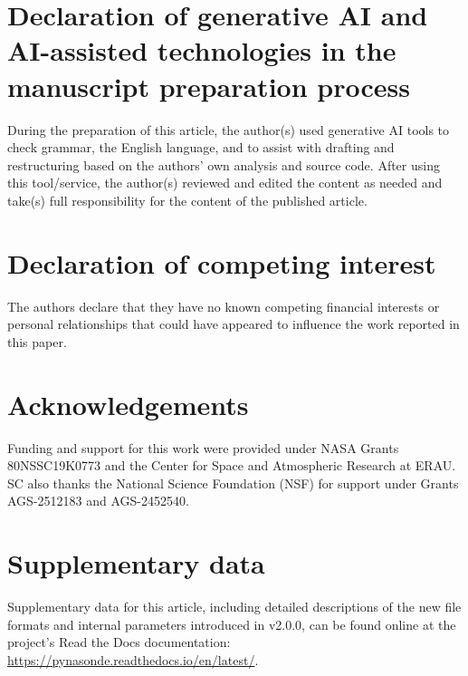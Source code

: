 \documentclass[12pt,a4paper]{article}
\begin{document}
\section*{Declaration of generative AI and AI-assisted technologies in the manuscript preparation process}

During the preparation of this article, the author(s) used generative AI
tools to check grammar, the English language, and to assist with drafting
and restructuring based on the authors' own analysis and source code. After
using this tool/service, the author(s) reviewed and edited the content as
needed and take(s) full responsibility for the content of the published
article.

\section*{Declaration of competing interest}

The authors declare that they have no known competing financial interests or
personal relationships that could have appeared to influence the work
reported in this paper.

\section*{Acknowledgements}

Funding and support for this work were provided under NASA Grants
80NSSC19K0773 and the Center for Space and Atmospheric Research at ERAU. SC
also thanks the National Science Foundation (NSF) for support under Grants
AGS-2512183 and AGS-2452540.

\appendix
\section{Supplementary data}

Supplementary data for this article, including detailed descriptions of the
new file formats and internal parameters introduced in v2.0.0, can be found
online at the project's Read the Docs documentation:
\url{https://pynasonde.readthedocs.io/en/latest/}.
\end{document}
